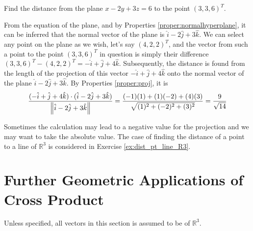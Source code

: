 \begin{exmp}
Find the distance from the plane $x-2y+3z = 6$ to the point $(3,3,6)^T$.
\end{exmp}
\begin{solution}
From the equation of the plane, and by Properties \ref{proper:normalhyperplane}, it can be inferred that the normal vector of the plane is $\hat{i} - 2\hat{j} + 3\hat{k}$. We can select any point on the plane as we wish, let's say $(4,2,2)^T$, and the vector from such a point to the point $(3,3,6)^T$ in question is simply their difference $(3,3,6)^T - (4,2,2)^T = -\hat{i} + \hat{j} + 4\hat{k}$. Subsequently, the distance is found from the length of the projection of this vector $-\hat{i} + \hat{j} + 4\hat{k}$ onto the normal vector of the plane $\hat{i} - 2\hat{j} + 3\hat{k}$. By Properties \ref{proper:proj}, it is
\begin{align*}
\frac{(-\hat{i} + \hat{j} + 4\hat{k}) \cdot (\hat{i} - 2\hat{j} + 3\hat{k})}{\norm{\hat{i} - 2\hat{j} + 3\hat{k}}} = \frac{(-1)(1)+(1)(-2)+(4)(3)}{\sqrt{(1)^2 + (-2)^2 + (3)^2}} = \frac{9}{\sqrt{14}}
\end{align*}
\end{solution}
Sometimes the calculation may lead to a negative value for the projection and we may want to take the absolute value. The case of finding the distance of a point to a line of $\mathbb{R}^3$ is considered in Exercise \ref{ex:dist_pt_line_R3}.

\section{Further Geometric Applications of Cross Product}
Unless specified, all vectors in this section is assumed to be of $\mathbb{R}^3$.

